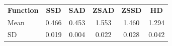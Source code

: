 \documentclass[conference]{IEEEtran}
\begin{document}
\begin{center}
    \begin{tabular}{l c c c c c}
        \textbf{Function} & \textbf{SSD} & \textbf{SAD} & \textbf{ZSAD} & \textbf{ZSSD} & \textbf{HD} \\ [0.5ex] 
        Mean & 0.466 & 0.453 & 1.553 & 1.460 & 1.294 \\
        SD & 0.019 & 0.004 & 0.022 & 0.028 & 0.042
    \end{tabular}
\end{center}
\end{document}
